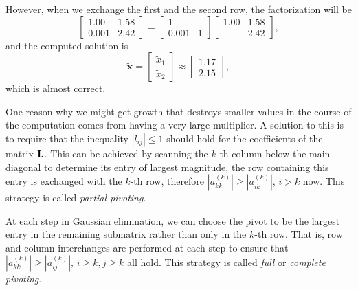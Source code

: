 \begin{exm}
    However, when we exchange the first and the second row, the 
    factorization will be
    $$
        \begin{bmatrix}
            1.00&1.58\\0.001&2.42
        \end{bmatrix}=
        \begin{bmatrix}
            1\\0.001&1
        \end{bmatrix}
        \begin{bmatrix}
            1.00&1.58\\&2.42
        \end{bmatrix},
    $$ 
    and the computed solution is 
    $$
    \tilde{\mathbf{x}}=\begin{bmatrix}
        \tilde{x}_1\\\tilde{x}_2
    \end{bmatrix}\approx
    \begin{bmatrix}
        1.17\\2.15
    \end{bmatrix},
    $$ 
    which is almost correct.
\end{exm}

\begin{defn}
    One reason why we might get growth that destroys smaller 
    values in the course of the computation comes from having a 
    very large multiplier. A solution to this is to require 
    that the inequality $|l_{ij}|\leq 1$ should hold for the 
    coefficients of the matrix ${\mathbf{L}}$. This can be achieved by 
    scanning the $k$-th column below the main diagonal to 
    determine its entry of largest magnitude, the row 
    containing this entry is exchanged with the $k$-th row, 
    therefore $|a_{kk}^{(k)}|\geq |a_{ik}^{(k)}|,\,i>k$ now.
    This strategy is called \textit{partial pivoting}.
\end{defn}

\begin{defn}
    At each step in Gaussian elimination, we can choose the 
    pivot to be the largest entry in the remaining submatrix 
    rather than only in the $k$-th row. 
    That is, row and column interchanges are performed at 
    each step to ensure that $|a_{kk}^{(k)}|\geq |a_{ij}^{(k)}|,
    \,i\geq k,j\geq k$ all hold. This strategy is called 
    \textit{full} or \textit{complete pivoting}.
\end{defn}

